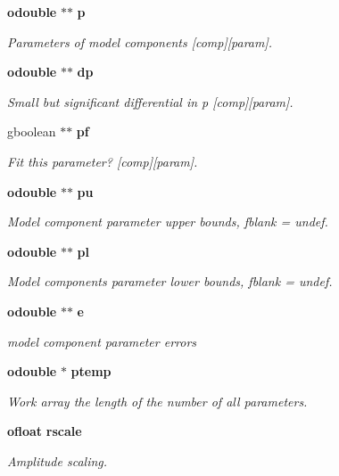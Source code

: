 \begin{CompactItemize}
{\bf odouble} $\ast$$\ast$ {\bf p}
\begin{CompactList}\small\item\em Parameters of model components [comp][param]. \item\end{CompactList}\item 
{\bf odouble} $\ast$$\ast$ {\bf dp}
\begin{CompactList}\small\item\em Small but significant differential in p [comp][param]. \item\end{CompactList}\item 
gboolean $\ast$$\ast$ {\bf pf}
\begin{CompactList}\small\item\em Fit this parameter? [comp][param]. \item\end{CompactList}\item 
{\bf odouble} $\ast$$\ast$ {\bf pu}
\begin{CompactList}\small\item\em Model component parameter upper bounds, fblank = undef. \item\end{CompactList}\item 
{\bf odouble} $\ast$$\ast$ {\bf pl}
\begin{CompactList}\small\item\em Model components parameter lower bounds, fblank = undef. \item\end{CompactList}\item 
{\bf odouble} $\ast$$\ast$ {\bf e}
\begin{CompactList}\small\item\em model component parameter errors \item\end{CompactList}\item 
{\bf odouble} $\ast$ {\bf ptemp}
\begin{CompactList}\small\item\em Work array the length of the number of all parameters. \item\end{CompactList}\item 
{\bf ofloat} {\bf rscale}
\begin{CompactList}\small\item\em Amplitude scaling. \item\end{CompactList}\item 

\end{CompactItemize}
